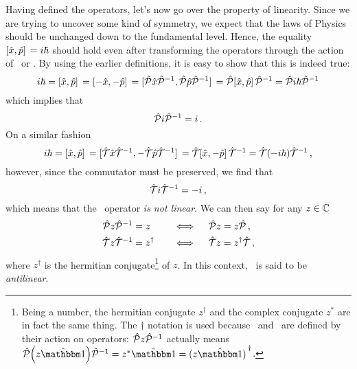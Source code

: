         Having defined the operators, let's now go over the property of linearity. Since we are trying to uncover some kind of symmetry, we expect that the laws of Physics should be unchanged down to the fundamental level. Hence, the equality $\comm*{\hx}{\hp} = i \hbar$ should hold even after transforming the operators through the action of \hP\ or \hT. By using the earlier definitions, it is easy to show that this is indeed true:
        \begin{equation*}
            i \hbar = \comm*{\hx}{\hp} = \comm*{-\hx}{-\hp} = \comm*{\hP \hx \hP^{-1}}{\hP \hp \hP^{-1}} = \hP \comm*{\hx}{\hp} \hP^{-1} = \hP i \hbar \hP^{-1}
        \end{equation*}
        which implies that
        \begin{equation}
            \label{eq:PiP}
            \mathcal{\hat{P}} i \mathcal{\hat{P}}^{-1} = i
            \,\text{.}
        \end{equation}
        On a similar fashion
        \begin{equation*}
            i \hbar
            = \comm*{\hx}{\hp}
            = \comm*{\hT \hx \hT^{-1}}{-\hT \hp \hT^{-1}}
            = \hT \comm*{\hx}{-\hp} \hT^{-1}
            = \hT \pqty{-i \hbar} \hT^{-1}
            \mycomma
        \end{equation*}
        however, since the commutator must be preserved, we find that
        \begin{equation}
            \label{eq:TiT}
            \mathcal{\hat{T}} i \mathcal{\hat{T}}^{-1} = -i
            \,\text{,}
        \end{equation}
        which means that the \hT\ operator \emph{is not linear}. We can then say for any $z \in \mathbb{C}$ 
        \begin{alignat}{3}
            \label{eq:P-linear}
            \mathcal{\hat{P}} z \mathcal{\hat{P}}^{-1} &= z        
            &\quad\iff\quad 
            \mathcal{\hat{P}} z &= z \mathcal{\hat{P}}
            \,\text{,}
            \\
            \label{eq:T-antilinear}
            \mathcal{\hat{T}} z \mathcal{\hat{T}}^{-1} &= z^{\dag} 
            &\quad\iff\quad 
            \mathcal{\hat{T}} z &= z^{\dag} \mathcal{\hat{T}}
            \,\text{,}
        \end{alignat}
        where $z^\dag$ is the hermitian conjugate\footnote{Being a number, the hermitian conjugate $z^\dag$ and the complex conjugate $z^*$ are in fact the same thing. The $\dag$ notation is used because \hP\ and \hT\ are defined by their action on operators: $\mathcal{\hat{P}} z \mathcal{\hat{P}}^{-1}$ actually means $\hP \pqty{z\togglehat{\idM}} \hP^{-1} = z^*\togglehat{\idM} = \pqty*{z \togglehat{\idM}}^\dag$.} of $z$. In this context, \hT\ is said to be \emph{antilinear}.

